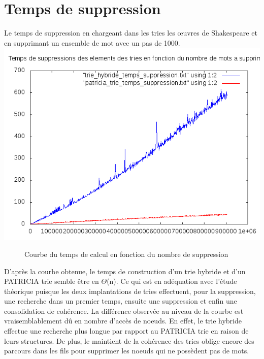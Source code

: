 \documentclass[a4paper,12pt]{report}
\begin{document}
\section{Temps de suppression}
Le temps de suppression en chargeant dans les tries les œuvres de Shakespeare et en supprimant un ensemble de mot avec un pas
de 1000.\\
\includegraphics{../comparaison/courbe_temps_suppression.png}
\begin{figure}[!htbp]
\caption{Courbe du temps de calcul en fonction du nombre de suppression}
\end{figure}

D'après la courbe obtenue, le temps de construction d'un trie hybride et d'un PATRICIA trie semble être en $\Theta$(n).
Ce qui est en adéquation avec l'étude théorique puisque les deux implantations de tries effectuent, pour la suppression,
une recherche dans un premier temps, ensuite une suppression et enfin une consolidation de cohérence.
La différence observée au niveau de la courbe est vraisemblablement dû en nombre d'accès de noeuds. En effet, le trie hybride
effectue une recherche plus longue par rapport au PATRICIA trie en raison de leurs structures. De plus, le maintient de la
cohérence des tries oblige encore des parcours dans les fils pour supprimer les noeuds qui ne possèdent pas de mots.
\end{document}
